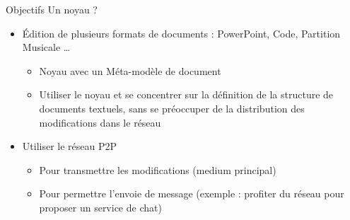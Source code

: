 \begin{frame}{Objectifs}
Un noyau ?
\begin{itemize}
  \item Édition de plusieurs formats de documents : PowerPoint, Code, Partition
  Musicale \ldots 
  \begin{itemize}
    \item Noyau avec un Méta-modèle de document
    \item Utiliser le noyau et se concentrer sur la définition de la structure
    de documents textuels, sans se préoccuper de la distribution des
    modifications dans le réseau
  \end{itemize}
  \item Utiliser le réseau P2P
  \begin{itemize}
    \item Pour transmettre les modifications (medium principal) 
    \item Pour permettre l'envoie de message (exemple : profiter du réseau pour
    proposer un service de chat) 
  \end{itemize}
\end{itemize}
\end{frame}

